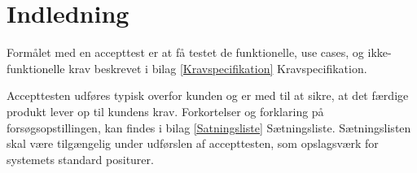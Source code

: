 \chapter{Indledning}\label{Indledning}
Formålet med en accepttest er at få testet de funktionelle, use cases, og ikke-funktionelle krav beskrevet i bilag \ref{Kravspecifikation} Kravspecifikation. 

Accepttesten udføres typisk overfor kunden og er med til at sikre, at det færdige produkt lever op til kundens krav. Forkortelser og forklaring på forsøgsopstillingen, kan findes i bilag \ref{Satningsliste}  Sætningsliste. Sætningslisten skal være tilgængelig under udførslen af accepttesten, som opslagsværk for systemets standard positurer. 